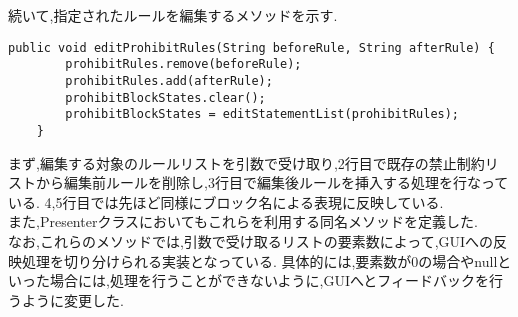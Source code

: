 \documentclass[uplatex,12pt]{jsarticle}
\begin{document}
続いて,指定されたルールを編集するメソッドを示す.
\begin{lstlisting}[caption=editProhibitRulesメソッドの実装, label=mid]
    public void editProhibitRules(String beforeRule, String afterRule) {
		prohibitRules.remove(beforeRule);
		prohibitRules.add(afterRule);
		prohibitBlockStates.clear();
		prohibitBlockStates = editStatementList(prohibitRules);
	}
\end{lstlisting}
まず,編集する対象のルールリストを引数で受け取り,2行目で既存の禁止制約リストから編集前ルールを削除し,3行目で編集後ルールを挿入する処理を行なっている.
4,5行目では先ほど同様にブロック名による表現に反映している. \\

また,Presenterクラスにおいてもこれらを利用する同名メソッドを定義した. \\
なお,これらのメソッドでは,引数で受け取るリストの要素数によって,GUIへの反映処理を切り分けられる実装となっている.
具体的には,要素数が0の場合やnullといった場合には,処理を行うことができないように,GUIへとフィードバックを行うように変更した.
\end{document}
